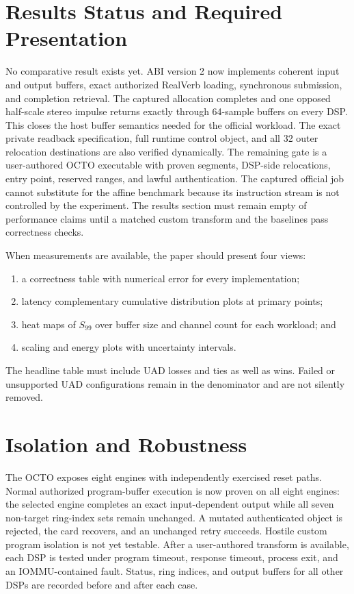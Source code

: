 \documentclass[10pt,twocolumn,twoside]{article}
\begin{document}
\section{Results Status and Required Presentation}

No comparative result exists yet. ABI version 2 now implements coherent input
and output buffers, exact authorized RealVerb loading, synchronous submission,
and completion retrieval. The captured allocation completes and one opposed
half-scale stereo impulse returns exactly through 64-sample buffers on every
DSP. This closes the host buffer semantics needed for the official workload.
The exact private readback specification, full runtime control object, and all
32 outer relocation destinations are also verified dynamically.
The remaining gate is a user-authored OCTO executable with proven segments,
DSP-side relocations, entry point, reserved ranges, and lawful authentication.
The captured official job cannot substitute for the affine benchmark because
its instruction stream is not controlled by the experiment. The results
section must remain empty of performance claims until a matched custom
transform and the baselines pass correctness checks.

When measurements are available, the paper should present four views:

\begin{enumerate}
  \item a correctness table with numerical error for every implementation;
  \item latency complementary cumulative distribution plots at primary points;
  \item heat maps of $S_{99}$ over buffer size and channel count for each
  workload; and
  \item scaling and energy plots with uncertainty intervals.
\end{enumerate}

The headline table must include UAD losses and ties as well as wins. Failed or
unsupported UAD configurations remain in the denominator and are not silently
removed.

\section{Isolation and Robustness}

The OCTO exposes eight engines with independently exercised reset paths. Normal
authorized program-buffer execution is now proven on all eight engines: the
selected engine completes an exact input-dependent output while all seven
non-target ring-index sets remain unchanged. A mutated authenticated object is
rejected, the card recovers, and an unchanged retry succeeds. Hostile custom
program isolation is not yet testable. After a user-authored transform is
available, each DSP is tested under program timeout, response timeout, process
exit, and an IOMMU-contained fault. Status, ring indices, and output buffers for
all other DSPs are recorded before and after each case.
\end{document}
